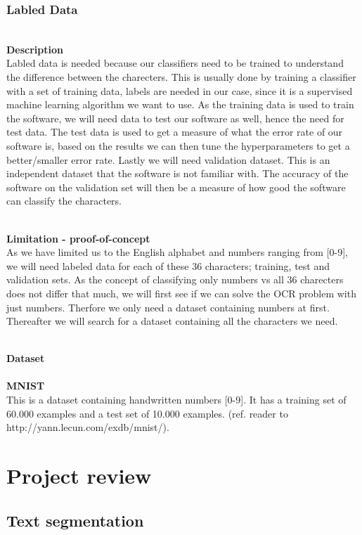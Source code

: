 \documentclass[11pt,a4paper,UKenglish]{article}
\begin{document}
\subsubsection{Labled Data}
\noindent \\ \textbf{Description}
\noindent \\
Labled data is needed because our classifiers need to be trained to understand
the difference between the charecters. This is usually done by training a
classifier with a set of training data, labels are needed in our case,
since it is a supervised machine learning algorithm we want to use. As the
training data is used to train the software, we will need data to test our
software as well, hence the need for test data. The test data is used to get a
measure of what the error rate of our software is, based on the results we
can then tune the hyperparameters to get a better/smaller error rate. Lastly
we will need validation dataset. This is an independent dataset that the software
is not familiar with. The accuracy of the software on the validation set will
then be a measure of how good the software can classify the characters.

\noindent \\ \textbf{Limitation - proof-of-concept}
\noindent \\
As we have limited us to the English alphabet and numbers ranging from [0-9],
we will need labeled data for each of these 36 characters; training, test and
validation sets. As the concept of classifying only numbers vs all 36
charecters does not differ that much, we will first see if we can solve the OCR
problem with just numbers. Therfore we only need a dataset containing numbers
at first. Thereafter we will search for a dataset containing all the characters
we need.

\noindent \\ \textbf{Dataset}
\noindent \\
\noindent \\ \textbf{MNIST}
\noindent \\ This is a dataset containing handwritten numbers [0-9].
It has a training set of 60.000 examples and a test set of 10.000 examples.
(ref. reader to http://yann.lecun.com/exdb/mnist/).



\section{Project review}
\subsection{Text segmentation}
\end{document}
